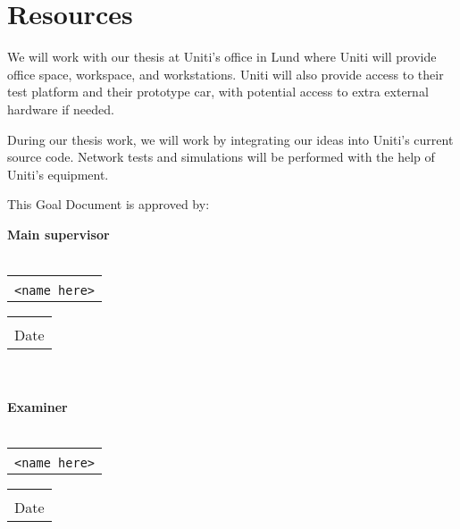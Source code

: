 \documentclass[a4paper]{article}
\makeatletter
\newcommand{\signature}[2]{%
	\noindent%
	\textbf{{#1}}\\\\
	\begin{tabular}{@{}p{2.5in}@{}}
		\\ \hline \\[-.75\normalbaselineskip]
		\texttt{{#2}}
	\end{tabular} \hspace{0in}
	\begin{tabular}{@{}p{2.5in}@{}}
		\\ \hline \\[-.75\normalbaselineskip]
		Date
	\end{tabular}\\
}
\makeatother
\begin{document}
\section{Resources}
We will work with our thesis at Uniti's office in Lund where Uniti will provide
office space, workspace, and workstations. Uniti will also provide access to
their test platform and their prototype car, with potential access to extra
external hardware if needed.

During our thesis work, we will work by integrating our ideas into Uniti's
current source code.
Network tests and simulations will be performed with the help of Uniti's
equipment.

{}



This Goal Document is approved by:

\signature{Main supervisor}{<name here>}\\

\signature{Examiner}{<name here>}
\end{document}
